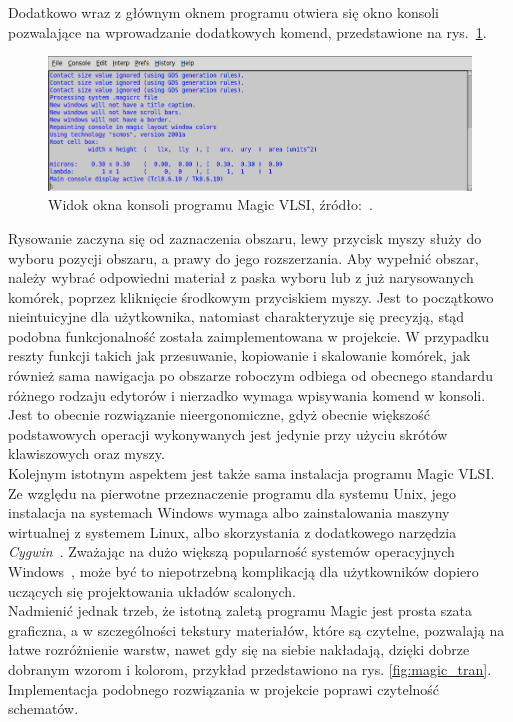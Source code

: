 \indent Dodatkowo wraz z głównym oknem programu otwiera się okno konsoli pozwalające na wprowadzanie dodatkowych komend,
przedstawione na rys.~\ref{fig:magic_konsola}.

\begin{figure}[h]
    \centering
    \includegraphics[width=.9\textwidth]{chapters/chapter2/img/magic_okno_konsola}
    \caption[Widok okna konsoli programu Magic VLSI.]{Widok okna konsoli programu Magic VLSI, źródło:~\cite{MAGIC_site}.}
    \label{fig:magic_konsola}
\end{figure}

\indent Rysowanie zaczyna się od zaznaczenia obszaru, lewy przycisk myszy służy do wyboru pozycji obszaru,
a prawy do jego rozszerzania.
Aby wypełnić obszar, należy wybrać odpowiedni materiał z paska wyboru
lub z już narysowanych komórek,
poprzez kliknięcie środkowym przyciskiem myszy.
Jest to początkowo nieintuicyjne dla użytkownika,
natomiast charakteryzuje się precyzją, stąd podobna funkcjonalność została zaimplementowana w projekcie.
W przypadku reszty funkcji takich jak przesuwanie, kopiowanie i skalowanie komórek,
jak również sama nawigacja po obszarze roboczym odbiega od obecnego standardu różnego rodzaju edytorów
i nierzadko wymaga wpisywania komend w konsoli.
Jest to obecnie rozwiązanie nieergonomiczne, gdyż obecnie większość podstawowych operacji wykonywanych jest
jedynie przy użyciu skrótów klawiszowych oraz myszy.\\
\indent Kolejnym istotnym aspektem jest także sama instalacja programu Magic VLSI\@.
Ze względu na pierwotne przeznaczenie programu dla systemu Unix,
jego instalacja na systemach Windows wymaga albo zainstalowania maszyny wirtualnej z systemem Linux,
albo skorzystania z dodatkowego narzędzia \textit{Cygwin}~\cite{MAGIC_site,cygwin}.
Zważając na dużo większą popularność systemów operacyjnych Windows~\cite{os_stats},
może być to niepotrzebną komplikacją dla użytkowników dopiero uczących się projektowania układów scalonych.\\
\indent Nadmienić jednak trzeb, że istotną zaletą programu Magic jest prosta szata graficzna,
a w szczególności tekstury materiałów, które są czytelne, pozwalają na łatwe rozróżnienie warstw,
nawet gdy się na siebie nakładają, dzięki dobrze dobranym wzorom i kolorom, przykład przedstawiono na rys. \ref{fig:magic_tran}.
Implementacja podobnego rozwiązania w projekcie poprawi czytelność schematów.

